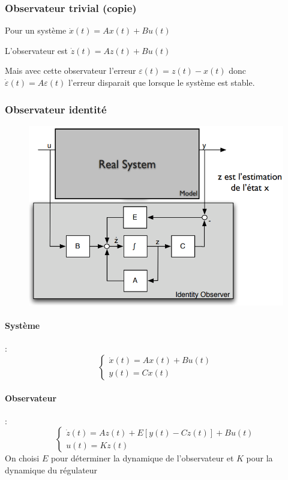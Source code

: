 \documentclass[resume]{subfiles}
\begin{document}
\subsubsection{Observateur trivial (copie)}

Pour un système $\dot{x}(t)=Ax(t)+Bu(t)$

L'observateur est $\dot{z}(t)= Az(t)+Bu(t)$

Mais avec cette observateur l'erreur $\varepsilon(t)=z(t)-x(t)$ donc $\dot{\varepsilon}(t)=A\varepsilon(t)$ l'erreur disparait que lorsque le système est stable.

\subsubsection{Observateur identité}
\begin{figure}[H]
\centering
\includegraphics[width=0.9\columnwidth]{img_23.png}
\end{figure}

\paragraph{Système} :
$$\begin{cases}\dot{x}(t)=Ax(t)+Bu(t)\\y(t)=Cx(t)\end{cases}$$
\paragraph{Observateur} :
$$\begin{cases}\dot{z}(t)=Az(t)+E\left[y(t)-Cz(t)\right]+Bu(t)\\
u(t)=Kz(t)\end{cases}$$
On choisi $E$ pour déterminer la dynamique de l'observateur et $K$ pour la dynamique du régulateur
\end{document}
